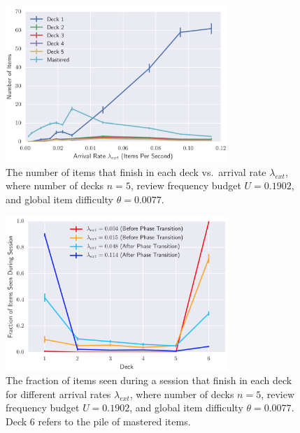 \begin{figure}
\centering
\includegraphics[width=0.75000\textwidth]{assets/verification2.png}
\caption[The number of items that finish in each deck vs.~arrival rate
\(\lambda_{ext}\), where number of decks \(n = 5\), review frequency
budget \(U = 0.1902\), and global item difficulty
\(\theta = 0.0077\).]{The number of items that finish in each deck
vs.~arrival rate \(\lambda_{ext}\), where number of decks \(n = 5\),
review frequency budget \(U = 0.1902\), and global item difficulty
\(\theta = 0.0077\).\footnotemark{}}\label{fig:verification2fig15}
\end{figure}

\begin{figure}
\centering
\includegraphics[width=0.75000\textwidth]{assets/verification3.png}
\caption[The fraction of items seen during a session that finish in each
deck for different arrival rates \(\lambda_{ext}\), where number of
decks \(n = 5\), review frequency budget \(U = 0.1902\), and global item
difficulty \(\theta = 0.0077\). Deck 6 refers to the pile of mastered
items.]{The fraction of items seen during a session that finish in each
deck for different arrival rates \(\lambda_{ext}\), where number of
decks \(n = 5\), review frequency budget \(U = 0.1902\), and global item
difficulty \(\theta = 0.0077\). Deck 6 refers to the pile of mastered
items.\footnotemark{}}\label{fig:verification3fig16}
\end{figure}

